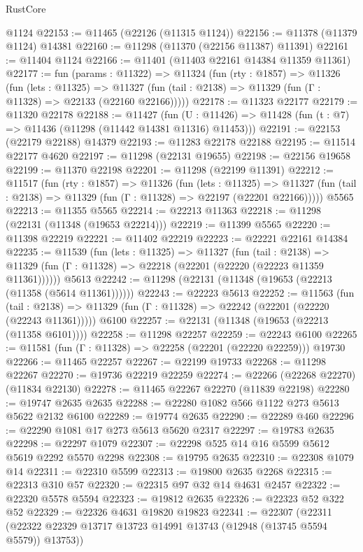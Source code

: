\begin{lexlean}{RustCore}
\begin{coremodule}
    @1124
@22153 := @11465 (@22126 (@11315 @1124))
@22156 := @11378 (@11379 @1124) @14381
@22160 := @11298 (@11370 (@22156 @11387) @11391)
@22161 := @11404 @1124
@22166 := @11401 (@11403 @22161 @14384 @11359 @11361)
@22177 := fun (params : @11322) =>
  @11324
    (fun (rty : @1857) =>
    @11326
      (fun (lets : @11325) =>
      @11327 (fun (tail : @2138) => @11329 (fun (Γ : @11328) => @22133 (@22160 @22166)))))
@22178 := @11323 @22177
@22179 := @11320 @22178
@22188 := @11427
    (fun (U : @11426) => @11428 (fun (t : @7) => @11436 (@11298 (@11442 @14381 @11316) @11453)))
@22191 := @22153 (@22179 @22188) @14379
@22193 := @11283 @22178 @22188
@22195 := @11514 @22177 @4620
@22197 := @11298 (@22131 @19655)
@22198 := @22156 @19658
@22199 := @11370 @22198
@22201 := @11298 (@22199 @11391)
@22212 := @11517
    (fun (rty : @1857) =>
    @11326
      (fun (lets : @11325) =>
      @11327 (fun (tail : @2138) => @11329 (fun (Γ : @11328) => @22197 (@22201 @22166)))))
    @5565
@22213 := @11355 @5565
@22214 := @22213 @11363
@22218 := @11298 (@22131 (@11348 (@19653 @22214)))
@22219 := @11399 @5565
@22220 := @11398 @22219
@22221 := @11402 @22219
@22223 := @22221 @22161 @14384
@22235 := @11539
    (fun (lets : @11325) =>
    @11327
      (fun (tail : @2138) =>
      @11329 (fun (Γ : @11328) => @22218 (@22201 (@22220 (@22223 @11359 @11361))))))
    @5613
@22242 := @11298 (@22131 (@11348 (@19653 (@22213 (@11358 (@5614 @11361))))))
@22243 := @22223 @5613
@22252 := @11563
    (fun (tail : @2138) => @11329 (fun (Γ : @11328) => @22242 (@22201 (@22220 (@22243 @11361)))))
    @6100
@22257 := @22131 (@11348 (@19653 (@22213 (@11358 @6101))))
@22258 := @11298 @22257
@22259 := @22243 @6100
@22265 := @11581 (fun (Γ : @11328) => @22258 (@22201 (@22220 @22259))) @19730
@22266 := @11465 @22257
@22267 := @22199 @19733
@22268 := @11298 @22267
@22270 := @19736 @22219 @22259
@22274 := @22266 (@22268 @22270) (@11834 @22130)
@22278 := @11465 @22267 @22270 (@11839 @22198)
@22280 := @19747 @2635 @2635
@22288 := @22280 @1082 @566 @1122 @273 @5613 @5622 @2132 @6100
@22289 := @19774 @2635
@22290 := @22289 @460
@22296 := @22290 @1081 @17 @273 @5613 @5620 @2317
@22297 := @19783 @2635
@22298 := @22297 @1079
@22307 := @22298 @525 @14 @16 @5599 @5612 @5619 @2292 @5570 @2298
@22308 := @19795 @2635
@22310 := @22308 @1079 @14
@22311 := @22310 @5599
@22313 := @19800 @2635 @2268
@22315 := @22313 @310 @57
@22320 := @22315 @97 @32 @14 @4631 @2457
@22322 := @22320 @5578 @5594
@22323 := @19812 @2635
@22326 := @22323 @52 @322 @52
@22329 := @22326 @4631 @19820 @19823
@22341 := @22307
    (@22311 (@22322 @22329 @13717 @13723 @14991 @13743 (@12948 (@13745 @5594 @5579)) @13753))

\end{coremodule}
\end{lexlean}
